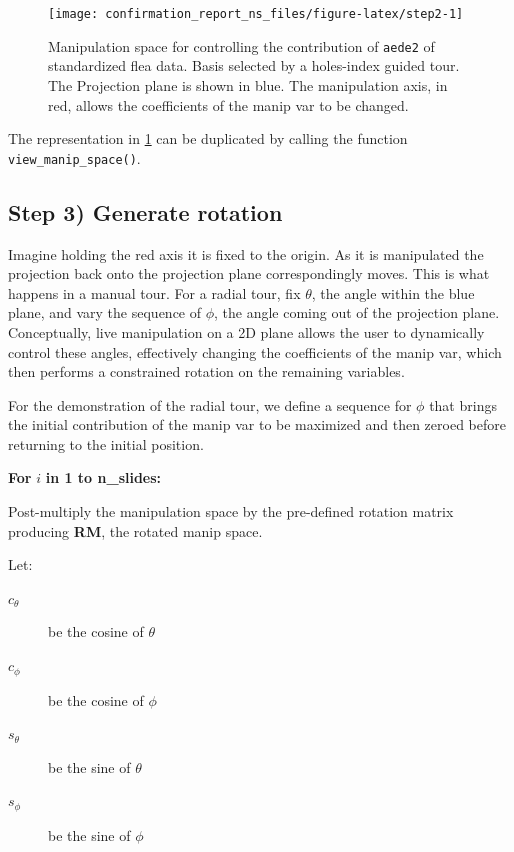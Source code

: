 \documentclass{monashthesis}
\theoremstyle{definition}
\theoremstyle{definition}
\theoremstyle{definition}
\theoremstyle{remark}
\begin{document}
\begin{figure}

{\centering \texttt{[image: confirmation\_report\_ns\_files/figure-latex/step2-1]} 

}

\caption{Manipulation space for controlling the contribution of
\texttt{aede2} of standardized flea data. Basis selected by a
holes-index guided tour. The Projection plane is shown in blue. The
manipulation axis, in red, allows the coefficients of the manip var to
be changed.}\label{fig:step2}
\end{figure}

The representation in \ref{fig:step2} can be duplicated by calling the
function \texttt{view\_manip\_space()}.

\subsection{Step 3) Generate rotation}\label{step-3-generate-rotation}

Imagine holding the red axis it is fixed to the origin. As it is
manipulated the projection back onto the projection plane
correspondingly moves. This is what happens in a manual tour. For a
radial tour, fix \(\theta\), the angle within the blue plane, and vary
the sequence of \(\phi\), the angle coming out of the projection plane.
Conceptually, live manipulation on a 2D plane allows the user to
dynamically control these angles, effectively changing the coefficients
of the manip var, which then performs a constrained rotation on the
remaining variables.

For the demonstration of the radial tour, we define a sequence for
\(\phi\) that brings the initial contribution of the manip var to be
maximized and then zeroed before returning to the initial position.

\textbf{For } \(i\) \textbf{in 1 to n\_slides:}

Post-multiply the manipulation space by the pre-defined rotation matrix
producing \textbf{RM}, the rotated manip space.

Let:

\begin{description}
  \item[$c_\theta$] be the cosine of $\theta$
  \item[$c_\phi$]   be the cosine of $\phi$
  \item[$s_\theta$] be the sine of   $\theta$
  \item[$s_\phi$]   be the sine of   $\phi$
\end{description}
\end{document}
